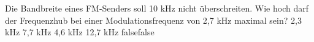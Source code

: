     {Die Bandbreite eines FM-Senders soll 10 kHz nicht überschreiten. Wie hoch darf der Frequenzhub bei einer Modulationsfrequenz von 2,7 kHz maximal sein?}
    {2,3 kHz}
    {7,7 kHz}
    {4,6 kHz}
    {12,7 kHz}
    {false}{false}